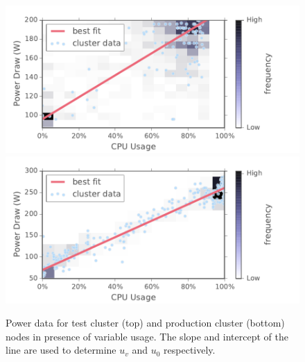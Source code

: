 \begin{figure}[t]
	\begin{center}
		\includegraphics[scale=0.55]{edeals/pwr_proc}
		\includegraphics[scale=0.55]{edeals/pwr_proc_c}
	\end{center}
	\caption{Power data for test cluster (top) and production cluster (bottom) nodes in presence of variable usage. The slope and intercept of the line are used to determine $u_v$ and $u_0$ respectively. }
	\label{pwr_proc}
\end{figure}

